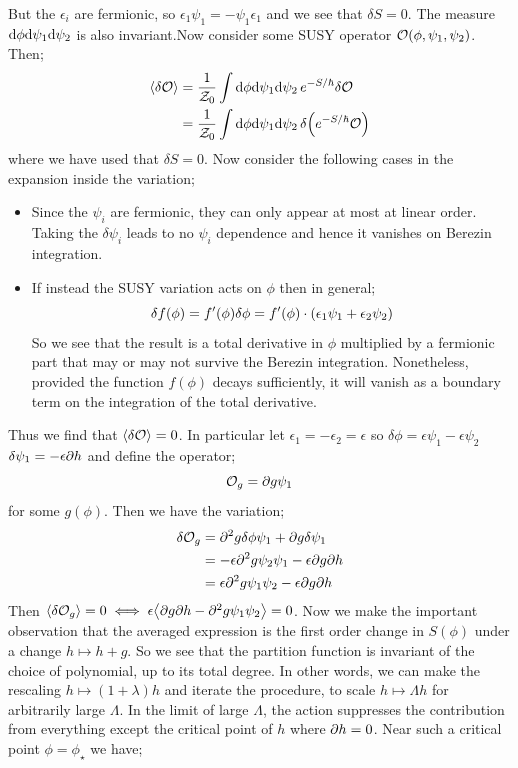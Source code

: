 But the $\epsilon_i$ are fermionic, so $\epsilon_1 \psi_1 = - \psi_1 \epsilon_1$ and we see that $\delta S = 0$. The measure $\text{d} \phi \text{d} \psi_1 \text{d} \psi_2$ is also invariant.\footnotemark Now consider some SUSY operator $\mathcal{O}(\phi, \psi_1, \psi_2)$. Then;
\begin{align*}
\left< \delta \mO \right> &= \frac{1}{\mZ_0}\int{\ud \phi \ud \psi_1 \upd{\psi_2} e^{-S/\hbar} \delta \mO} \\
&= \frac{1}{\mZ_0}\int{\ud \phi \ud \psi_1 \upd{\psi_2}\delta\left(e^{-S/\hbar} \mO\right)}
\end{align*}
where we have used that $\delta S = 0$. Now consider the following cases in the expansion inside the variation;
\begin{itemize}
\item Since the $\psi_i$ are fermionic, they can only appear at most at linear order. Taking the $\delta \psi_i$ leads to no $\psi_i$ dependence and hence it vanishes on Berezin integration. 
\item If instead the SUSY variation acts on $\phi$ then in general;
\begin{equation*}
\delta f(\phi) = f^{\prime}(\phi)\delta \phi = f^{\prime}(\phi)\cdot(\epsilon_1 \psi_1 + \epsilon_2 \psi_2)
\end{equation*}
So we see that the result is a total derivative in $\phi$ multiplied by a fermionic part that may or may not survive the Berezin integration. Nonetheless, provided the function $f(\phi)$ decays sufficiently, it will vanish as a boundary term on the integration of the total derivative. 
\end{itemize}
Thus we find that $\left< \delta \mO \right> = 0$. In particular let $\epsilon_1 = - \epsilon_2 = \epsilon$ so $\delta \phi = \epsilon \psi_1 - \epsilon \psi_2$ $\delta \psi_1 = - \epsilon \partial h$ and define the operator;
\begin{equation}
\mathcal{O}_g = \partial g \psi_1
\end{equation}
for some $g(\phi)$. Then we have the variation;
\begin{align*}
\delta \mathcal{O}_g &= \partial^2 g \delta \phi \psi_1 + \partial g \delta \psi_1 \\
&= -\epsilon \partial^2 g \psi_2 \psi_1 - \epsilon \partial g \partial h \\
&= \epsilon \partial^2 g \psi_1 \psi_2 - \epsilon \partial g \partial h
\end{align*}
Then $\left< \delta \mO_g \right> = 0 \iff \epsilon \left< \del g \del h - \del^2 g \psi_1 \psi_2 \right> = 0$. Now we make the important observation that the averaged expression is the first order change in $S(\phi)$ under a change $h \mapsto h + g$. So we see that the partition function is invariant of the choice of polynomial, up to its total degree. In other words, we can make the rescaling $h \mapsto (1 + \lambda)h$ and iterate the procedure, to scale $h \mapsto \Lambda h$ for arbitrarily large $\Lambda$. In the limit of large $\Lambda$, the action suppresses the contribution from everything except the critical point of $h$ where $\partial h = 0$. Near such a critical point $\phi = \phi_\star$ we have;
